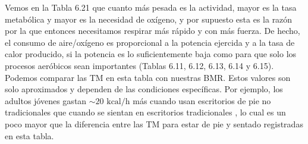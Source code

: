 \documentclass[12pt]{book}
\begin{document}
Vemos en la Tabla 6.21 que cuanto más pesada es la actividad, mayor es la tasa metabólica y mayor es la necesidad de oxígeno, y por supuesto esta es la razón por la que entonces necesitamos respirar más rápido y con más fuerza. De hecho, el consumo de aire/oxígeno es proporcional a la potencia ejercida y a la tasa de calor producido, si la potencia es lo suficientemente baja como para que solo los procesos aeróbicos sean importantes (Tablas 6.11, 6.12, 6.13, 6.14 y 6.15). Podemos comparar las TM en esta tabla con nuestras BMR. Estos valores son solo aproximados y dependen de las condiciones específicas. Por ejemplo, los adultos jóvenes gastan $\sim 20\text{ kcal/h}$ más cuando usan escritorios de pie no tradicionales que cuando se sientan en escritorios tradicionales \cite{87}, lo cual es un poco mayor que la diferencia entre las TM para estar de pie y sentado registradas en esta tabla.
\end{document}
